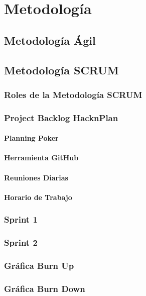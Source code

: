 \chapter{Metodología}

\section{Metodología Ágil}

\section{Metodología SCRUM}

\subsection{Roles de la Metodología SCRUM}

\subsection{Project Backlog HacknPlan}

\subsubsection{Planning Poker}

\subsubsection{Herramienta GitHub}

\subsubsection{Reuniones Diarias}

\subsubsection{Horario de Trabajo}

\subsection{Sprint 1}

\subsection{Sprint 2}

\subsection{Gráfica Burn Up}

\subsection{Gráfica Burn Down}
